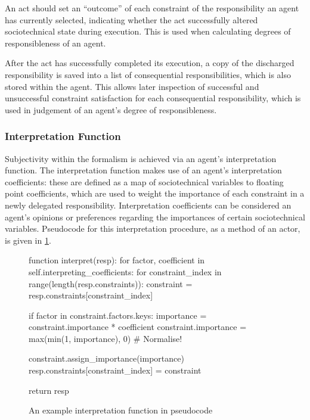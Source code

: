 An act should set an ``outcome'' of each constraint of the responsibility an agent has currently selected, indicating whether the act successfully altered sociotechnical state during execution. This is used when calculating degrees of responsibleness of an agent.\par

After the act has successfully completed its execution, a copy of the discharged responsibility is saved into a list of consequential responsibilities, which is also stored within the agent. This allows later inspection of successful and unsuccessful constraint satisfaction for each consequential responsibility, which is used in judgement of an agent's degree of responsibleness.\par

\subsubsection{Interpretation Function}\label{subsec:interpretation_function}
Subjectivity within the formalism is achieved via an agent's interpretation function. The interpretation function makes use of an agent's interpretation coefficients: these are defined as a map of sociotechnical variables to floating point coefficients, which are used to weight the importance of each constraint in a newly delegated responsibility. Interpretation coefficients can be considered an agent's opinions or preferences regarding the importances of certain sociotechnical variables. Pseudocode for this interpretation procedure, as a method of an actor, is given in \cref{code:interpretation_function}.

\begin{figure}[h]
    \centering
    \begin{pseudocodelisting}
    function interpret(resp):
        for factor, coefficient in self.interpreting_coefficients:
            for constraint_index in range(length(resp.constraints)):
                constraint = resp.constraints[constraint_index]

                if factor in constraint.factors.keys:
                    importance = constraint.importance * coefficient
                    constraint.importance = max(min(1, importance), 0)  # Normalise!

                constraint.assign_importance(importance)
                resp.constraints[constraint_index] = constraint

        return resp
    \end{pseudocodelisting}
    \caption{An example interpretation function in pseudocode}
    \label{code:interpretation_function}
\end{figure}


